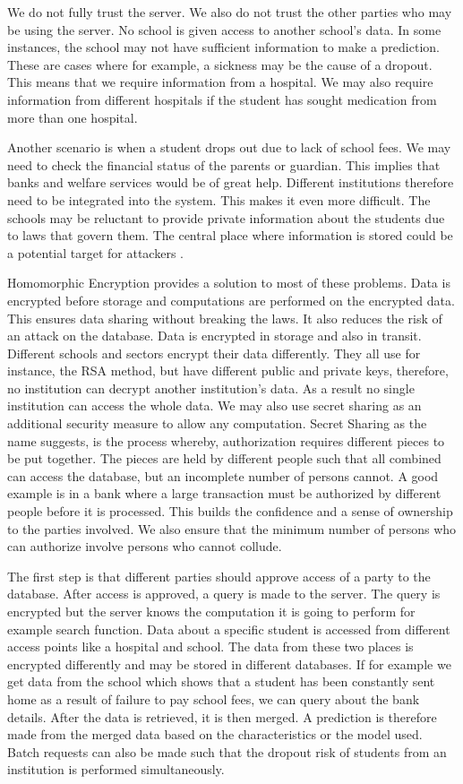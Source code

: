 We do not fully trust the server. We also do not trust the other parties who may be using the server. No school is given access to another school's data. In some instances, the school may not have sufficient information to make a prediction. These are cases where for example, a sickness may be the cause of a dropout. This means that we require information from a hospital. We may also require information from different hospitals if the student has sought medication from more than one hospital. 

Another scenario is when a student drops out due to lack of school fees. We may need to check the financial status of the parents or guardian. This implies that banks and welfare services would be of great help. Different institutions therefore need to be integrated into the system. This makes it even more difficult. The schools may be reluctant to provide private information about the students due to laws that govern them. The central place where information is stored could be a potential target for attackers \citep{archerapplications}.

Homomorphic Encryption provides a solution to most of these problems. Data is encrypted before storage and computations are performed on the encrypted data. This ensures data sharing without breaking the laws. It also reduces the risk of an attack on the database. Data is encrypted in storage and also in transit. Different schools and sectors encrypt their data differently. They all use for instance, the RSA method, but have different public and private keys, therefore, no institution can decrypt another institution's data. As a result no single institution can access the whole data. We may also use secret sharing as an additional security measure to allow any computation. Secret Sharing as the name suggests, is the process whereby, authorization requires different pieces to be put together. The pieces are held by different people such that all combined can access the database, but an incomplete number of persons cannot. A good example is in a bank where a large transaction must be authorized by different people before it is processed. This builds the confidence  and a sense of ownership to the parties involved. We also ensure that the minimum number of persons  who can authorize involve persons who cannot collude. 

The first step is that different parties should approve access of a party to the database. After access is approved, a query is made to the server. The query is encrypted but the server knows the computation it is going to perform for example search function. Data about a specific student is accessed from different access points like a hospital and school. The data from these two places is encrypted differently and may be stored in different databases. If for example we get data from the school which shows that a student has been constantly sent home as a result of failure to pay school fees, we can query about the bank details. After the data is retrieved, it is then merged. A prediction is therefore made from the merged data based on the characteristics or the model used. Batch requests can also be made such that the dropout risk of students from an institution is performed simultaneously. 

